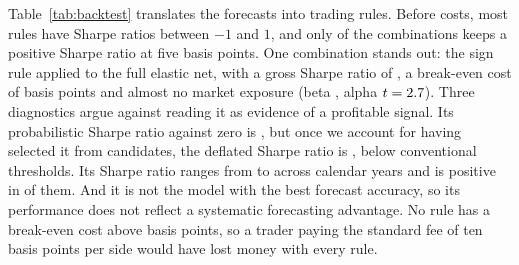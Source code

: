 Table~\ref{tab:backtest} translates the forecasts into trading rules. Before costs, most rules have
Sharpe ratios between $-1$ and $1$, and only \BTCnPosSRfive{} of the \BTCnTrials{} combinations keeps a
positive Sharpe ratio at five basis points. One combination stands out: the sign rule applied to
the full elastic net, with a gross Sharpe ratio of \BTCbestSR, a break-even cost of \BTCbestBE{}
basis points and almost no market exposure (beta \BTCbestBeta, alpha $t=2.7$). Three
diagnostics argue against reading it as evidence of a profitable signal. Its probabilistic Sharpe
ratio against zero is \BTCbestPSR, but once we account for having selected it from \BTCnTrials{}
candidates, the deflated Sharpe ratio is \BTCbestDSR, below conventional thresholds. Its Sharpe ratio
ranges from \BTCbestSRmin{} to \BTCbestSRmax{} across calendar years and is positive in \BTCbestYears{}
of them. And it is not the model with the best forecast accuracy, so its performance does not reflect
a systematic forecasting advantage. No rule has a break-even cost above \BTCmaxBE{} basis points, so a
trader paying the standard fee of ten basis points per side would have lost money with every rule.
